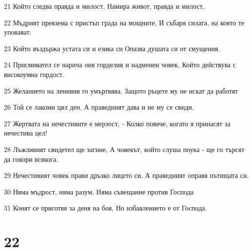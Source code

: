 \par 21 Който следва правда и милост, Намира живот, правда и милост,
\par 22 Мъдрият превзема с пристъп града на мощните, И събаря силата, на която те уповават.
\par 23 Който въздържа устата си и езика си Опазва душата си от смущения.
\par 24 Присмивател се нарича оня горделив и надменен човек, Който действува с високоумна гордост.
\par 25 Желанието на ленивия го умъртвява, Защото ръцете му не искат да работят
\par 26 Той се лакоми цял ден, А праведният дава и не му се свиди.
\par 27 Жертвата на нечестивите е мерзост, - Колко повече, когато я принасят за нечестива цел!
\par 28 Лъжливият свидетел ще загине, А човекът, който слуша поука - ще го търсят да говори всякога.
\par 29 Нечестивият човек прави дръзко лицето си, А праведният оправя пътищата си.
\par 30 Няма мъдрост, няма разум, Няма съвещание против Господа.
\par 31 Конят се приготвя за деня на боя, Но избавлението е от Господа.

\chapter{22}

